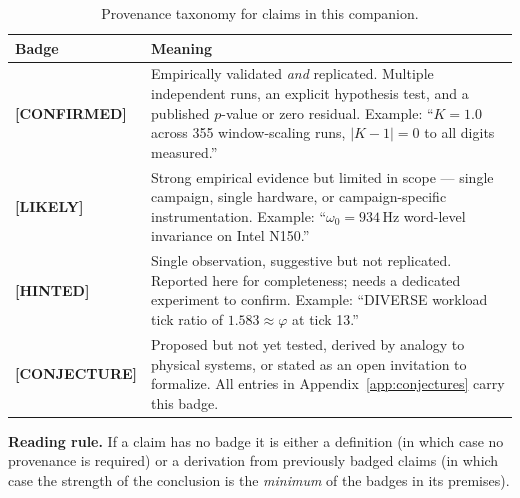 \documentclass[11pt,letterpaper,openany]{book}
\theoremstyle{definition}
\theoremstyle{plain}
\newcommand{\confirmed}{\textcolor{green!50!black}{\textbf{[CONFIRMED]}}\xspace}
\newcommand{\likely}{\textcolor{blue!60!black}{\textbf{[LIKELY]}}\xspace}
\newcommand{\hinted}{\textcolor{orange!75!black}{\textbf{[HINTED]}}\xspace}
\newcommand{\conjecture}{\textcolor{red!60!black}{\textbf{[CONJECTURE]}}\xspace}
\begin{document}
\begin{table}[H]
  \centering
  \small
  \begin{tabular}{p{} p{}}
    \toprule
    Badge & Meaning \\
    \midrule
    \confirmed       & Empirically validated \emph{and} replicated. Multiple
                       independent runs, an explicit hypothesis test, and
                       a published $p$-value or zero residual.
                       Example: ``$K = 1.0$ across 355 window-scaling runs,
                       $|K-1| = 0$ to all digits measured.'' \\[0.4em]
    \likely          & Strong empirical evidence but limited in scope ---
                       single campaign, single hardware, or
                       campaign-specific instrumentation.
                       Example: ``$\omega_0 = 934$\,Hz word-level invariance
                       on Intel N150.'' \\[0.4em]
    \hinted          & Single observation, suggestive but not replicated.
                       Reported here for completeness; needs a dedicated
                       experiment to confirm. Example: ``DIVERSE workload
                       tick ratio of $1.583\approx\varphi$ at tick 13.'' \\[0.4em]
    \conjecture      & Proposed but not yet tested, derived by analogy to
                       physical systems, or stated as an open invitation to
                       formalize. All entries in
                       Appendix~\ref{app:conjectures} carry this badge. \\
    \bottomrule
  \end{tabular}
  \caption{Provenance taxonomy for claims in this companion.}
\end{table}

\noindent\textbf{Reading rule.} If a claim has no badge it is either a
definition (in which case no provenance is required) or a derivation from
previously badged claims (in which case the strength of the conclusion is
the \emph{minimum} of the badges in its premises).
\end{document}
